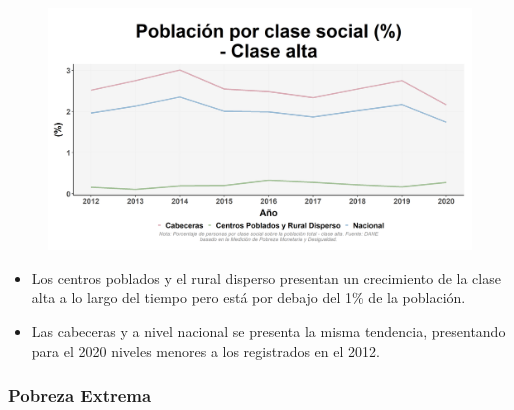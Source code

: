     \begin{figure}[H]
        \caption[Población por clase social - Clase alta por zonas ]{\label{clase_alta_zonas} }
        \begin{center}
        \includegraphics[width=\textwidth,keepaspectratio]{img/var_252_trend.png}
        \end{center}
    \end{figure}
            \begin{itemize}
                    \item Los centros poblados y el rural disperso presentan un crecimiento de la clase alta a lo largo del tiempo pero está por debajo del 1\% de la población.
                    \item Las cabeceras y a nivel nacional se presenta la misma tendencia, presentando para el 2020 niveles menores a los registrados en el 2012.
                    \end{itemize}

        \subsubsection{Pobreza Extrema}


